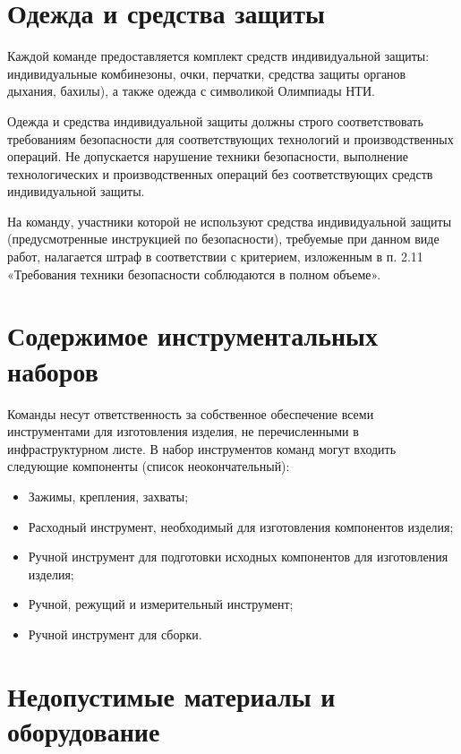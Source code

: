 \section{Одежда и средства защиты}

Каждой команде предоставляется комплект средств индивидуальной защиты: индивидуальные комбинезоны, очки, перчатки, средства защиты органов дыхания, бахилы), а также одежда с символикой Олимпиады НТИ.

Одежда и средства индивидуальной защиты должны строго соответствовать требованиям безопасности для соответствующих технологий и производственных операций. Не допускается нарушение техники безопасности, выполнение технологических и производственных операций без соответствующих средств индивидуальной защиты.

На команду, участники которой не используют средства индивидуальной защиты (предусмотренные инструкцией по безопасности), требуемые при данном виде работ, налагается штраф в соответствии с критерием, изложенным в п. 2.11 «Требования техники безопасности соблюдаются в полном объеме».

\section{Содержимое инструментальных наборов}

Команды несут ответственность за собственное обеспечение всеми инструментами для изготовления изделия, не перечисленными в инфраструктурном листе. В набор инструментов команд могут входить следующие компоненты (список неокончательный):
\begin{itemize}
    \item Зажимы, крепления, захваты;
    \item Расходный инструмент, необходимый для изготовления компонентов изделия;
    \item Ручной инструмент для подготовки исходных компонентов для изготовления изделия;
    \item Ручной, режущий и измерительный инструмент;
    \item Ручной инструмент для сборки.
\end{itemize}

\section{Недопустимые материалы и оборудование}

